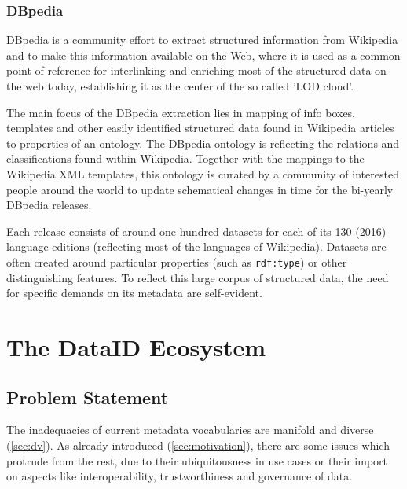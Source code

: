 \documentclass[a4paper,english,twoside,BCOR1.5cm,headsepline,DIV12,appendixprefix,final,12pt]{scrbook}
\newcommand{\prop}[1]{{{\texttt{#1}}}}
\begin{document}
\subsection{DBpedia}
\label{sec:dbpedia}

DBpedia is a community effort to extract structured information from Wikipedia and to make this information available on the Web, where it is used as a common point of reference for interlinking and enriching most of the structured data on the web today, establishing it as the center of the so called 'LOD cloud'. 

The main focus of the DBpedia extraction lies in mapping of info boxes, templates and other easily identified structured data found in Wikipedia articles to properties of an ontology. The DBpedia ontology is reflecting the relations and classifications found within Wikipedia. Together with the mappings to the Wikipedia XML templates, this ontology is curated by a community of interested people around the world to update schematical changes in time for the bi-yearly DBpedia releases. 

Each release consists of around one hundred datasets for each of its 130 (2016) language editions (reflecting most of the languages of Wikipedia). Datasets are often created around particular properties (such as \prop{rdf:type}) or other distinguishing features. To reflect this large corpus of structured data, the need for specific demands on its metadata are self-evident.


\chapter{The DataID Ecosystem}
\label{chap:ecosystem}

\section{Problem Statement} 
\label{sec:probstat}

The inadequacies of current metadata vocabularies are manifold and diverse (\cref{sec:dv}). As already introduced (\cref{sec:motivation}), there are some issues which protrude from the rest, due to their ubiquitousness in use cases or their import on aspects like interoperability, trustworthiness and governance of data.
\end{document}
